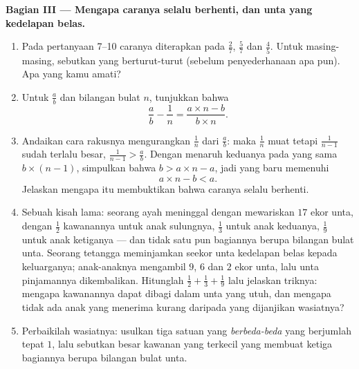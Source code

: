 \begin{problem}
\medskip
\noindent\textbf{Bagian III --- Mengapa caranya selalu berhenti, dan
unta yang kedelapan belas.}
\begin{enumerate}[resume]
  \item Pada pertanyaan 7--10 caranya diterapkan pada $\frac27$,
        $\frac57$ dan $\frac45$. Untuk masing-masing, sebutkan
          yang berturut-turut (sebelum penyederhanaan
        apa pun). Apa yang kamu amati?
  \item Untuk  $\frac ab$ dan bilangan bulat $n$, tunjukkan
        bahwa
        \[
        \frac{a}{b} - \frac{1}{n}
        = \frac{a \times n - b}{b \times n} .
        \]
  \item Andaikan cara rakusnya mengurangkan $\frac1n$ dari
        $\frac ab$: maka $\frac1n$ muat tetapi $\frac{1}{n-1}$ sudah
        terlalu besar, $\frac{1}{n-1} > \frac ab$. Dengan menaruh
        keduanya pada  yang sama $b \times (n - 1)$,
        simpulkan bahwa $b > a \times n - a$, jadi  yang
        baru memenuhi
        \[
        a \times n - b < a .
        \]
        Jelaskan mengapa itu membuktikan bahwa caranya selalu
        berhenti.
  \item Sebuah kisah lama: seorang ayah meninggal dengan mewariskan
        $17$ ekor unta, dengan $\frac12$ kawanannya untuk anak
        sulungnya, $\frac13$ untuk anak keduanya, $\frac19$ untuk
        anak ketiganya --- dan tidak satu pun bagiannya berupa
        bilangan bulat unta. Seorang tetangga meminjamkan seekor unta
        kedelapan belas kepada keluarganya; anak-anaknya mengambil
        $9$, $6$ dan $2$ ekor unta, lalu unta pinjamannya
        dikembalikan. Hitunglah
        $\frac12 + \frac13 + \frac19$ lalu jelaskan triknya: mengapa
        kawanannya dapat dibagi dalam unta yang utuh, dan mengapa
        tidak ada anak yang menerima kurang daripada yang dijanjikan
        wasiatnya?
  \item Perbaikilah wasiatnya: usulkan tiga  satuan yang
        \emph{berbeda-beda} yang berjumlah tepat $1$, lalu sebutkan
        besar kawanan yang terkecil yang membuat ketiga bagiannya
        berupa bilangan bulat unta.

\end{enumerate}
\end{problem}
